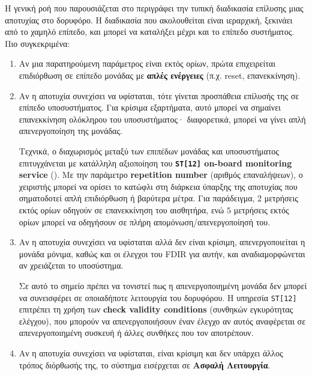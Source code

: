 \documentclass[a4paper,nobib]{tufte-book}
\begin{document}
Η γενική ροή που παρουσιάζεται στο  περιγράφει την τυπική διαδικασία επίλυσης μιας αποτυχίας στο δορυφόρο. Η διαδικασία που ακολουθείται είναι ιεραρχική, ξεκινάει από το χαμηλό επίπεδο, και μπορεί να καταλήξει μέχρι και το επίπεδο συστήματος. Πιο συγκεκριμένα:
\begin{enumerate}
	\item Αν μια παρατηρούμενη παράμετρος είναι εκτός ορίων, πρώτα επιχειρείται επιδιόρθωση σε επίπεδο μονάδας με \textbf{απλές ενέργειες} (π.χ. reset, επανεκκίνηση).
	\item Αν η αποτυχία συνεχίσει να υφίσταται, τότε γίνεται προσπάθεια επίλυσής της σε επίπεδο υποσυστήματος. Για κρίσιμα εξαρτήματα, αυτό μπορεί να σημαίνει επανεκκίνηση ολόκληρου του υποσυστήματος· διαφορετικά, μπορεί να γίνει απλή απενεργοποίηση της μονάδας.
	
	Τεχνικά, ο διαχωρισμός μεταξύ των επιπέδων μονάδας και υποσυστήματος επιτυγχάνεται με κατάλληλη αξιοποίηση του \textbf{\texttt{ST[12]} on-board monitoring service} (). Με την παράμετρο \textbf{repetition number} (αριθμός επαναλήψεων), ο χειριστής μπορεί να ορίσει το κατώφλι στη διάρκεια ύπαρξης της αποτυχίας που σηματοδοτεί απλή επιδιόρθωση ή βαρύτερα μέτρα. Για παράδειγμα, \( 2 \) μετρήσεις εκτός ορίων οδηγούν σε επανεκκίνηση του αισθητήρα, ενώ \( 5 \) μετρήσεις εκτός ορίων μπορεί να οδηγήσουν σε πλήρη απομόνωση/απενεργοποίησή του.
	\item Αν η αποτυχία συνεχίσει να υφίσταται αλλά δεν είναι κρίσιμη, απενεργοποιείται η μονάδα μόνιμα, καθώς και οι έλεγχοι του \acs{FDIR} για αυτήν, και αναδιαμορφώνεται αν χρειάζεται το υποσύστημα.
	
	Σε αυτό το σημείο πρέπει να τονιστεί πως η απενεργοποιημένη μονάδα δεν μπορεί να συνεισφέρει σε οποιαδήποτε λειτουργία του δορυφόρου. Η υπηρεσία \texttt{ST[12]} επιτρέπει τη χρήση των \textbf{check validity conditions} (συνθηκών εγκυρότητας ελέγχου), που μπορούν να απενεργοποιήσουν έναν έλεγχο αν αυτός αναφέρεται σε απενεργοποιημένη συσκευή ή άλλες συνθήκες που τον αποτρέπουν.
	\item Αν η αποτυχία συνεχίσει να υφίσταται, είναι κρίσιμη και δεν υπάρχει άλλος τρόπος διόρθωσής της, το σύστημα εισέρχεται σε \textbf{Ασφαλή Λειτουργία}.
\end{enumerate}
\end{document}
